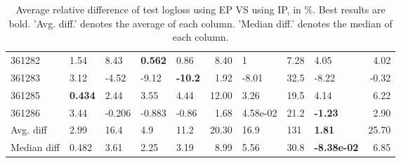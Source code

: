 \begin{table}[ht!]
\begin{tabular}{lllllrlllr}
  361282 & 1.54 & 8.43 & \textbf{0.562} & 0.86 & 8.40 & 1 & 7.28 & 4.05 & 4.02 \\ 
  361283 & 3.12 & -4.52 & -9.12 & \textbf{-10.2} & 1.92 & -8.01 & 32.5 & -8.22 & -0.32 \\ 
  361285 & \textbf{0.434} & 2.44 & 3.55 & 4.44 & 12.00 & 3.26 & 19.5 & 4.14 & 6.22 \\ 
  361286 & 3.44 & -0.206 & -0.883 & -0.86 & 1.68 &  4.58e-02 & 21.2 & \textbf{-1.23} & 2.90 \\ 
   \hline
Avg. diff & 2.99 & 16.4 & 4.9 & 11.2 & 20.30 & 16.9 & 131 & \textbf{1.81} & 25.70 \\ 
  Median diff & 0.482 & 3.61 & 2.25 & 3.19 & 8.99 & 5.56 & 30.8 & \textbf{-8.38e-02} & 6.85 \\ 
   \hline
\hline
\end{tabular}
\endgroup
\caption{Average relative difference of test logloss using EP VS using IP, in \%. 
                  Best results are bold. 
                  'Avg. diff.' denotes the average of each column.
                  'Median diff.' denotes the median of each column.} 
\label{TABLES/table_results_logloss_only_num_features_EP_VS_IP}
\end{table}

